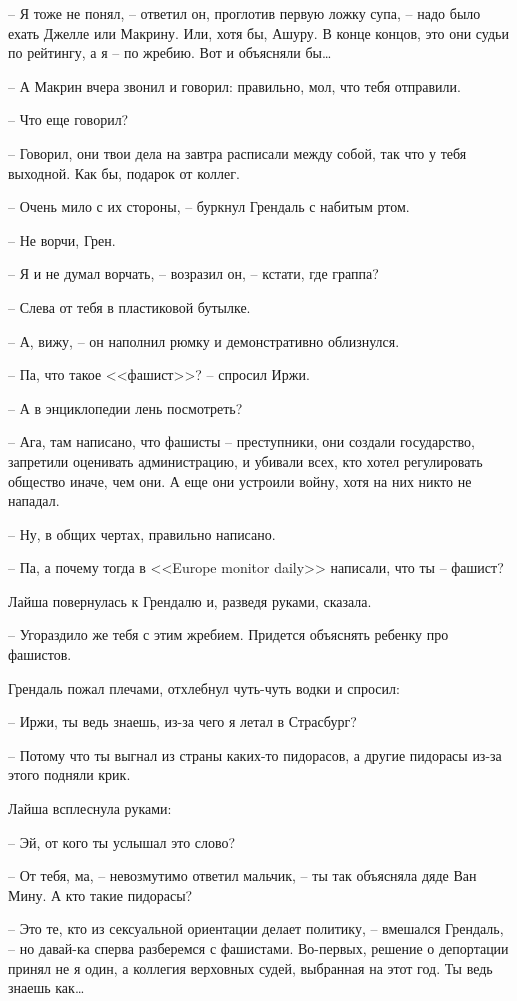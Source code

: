-- Я тоже не понял, -- ответил он, проглотив первую ложку супа, -- надо было ехать Джелле или Макрину. Или, хотя бы, Ашуру. В конце концов, это они судьи по рейтингу, а я -- по жребию. Вот и объясняли бы\ldots{}

-- А Макрин вчера звонил и говорил: правильно, мол, что тебя отправили.

-- Что еще говорил?

-- Говорил, они твои дела на завтра расписали между собой, так что у тебя выходной. Как бы, подарок от коллег.

-- Очень мило с их стороны, -- буркнул Грендаль с набитым ртом.

-- Не ворчи, Грен.

-- Я и не думал ворчать, -- возразил он, -- кстати, где граппа?

-- Слева от тебя в пластиковой бутылке.

-- А, вижу, -- он наполнил рюмку и демонстративно облизнулся.

-- Па, что такое <<фашист>>? -- спросил Иржи.

-- А в энциклопедии лень посмотреть?

-- Ага, там написано, что фашисты -- преступники, они создали государство, запретили оценивать администрацию, и убивали всех, кто хотел регулировать общество иначе, чем они. А еще они устроили войну, хотя на них никто не нападал.

-- Ну, в общих чертах, правильно написано.

-- Па, а почему тогда в <<Europe monitor daily>> написали, что ты -- фашист?

Лайша повернулась к Грендалю и, разведя руками, сказала.

-- Угораздило же тебя с этим жребием. Придется объяснять ребенку про фашистов.

Грендаль пожал плечами, отхлебнул чуть-чуть водки и спросил:

-- Иржи, ты ведь знаешь, из-за чего я летал в Страсбург?

-- Потому что ты выгнал из страны каких-то пидорасов, а другие пидорасы из-за этого подняли крик.

Лайша всплеснула руками:

-- Эй, от кого ты услышал это слово?

-- От тебя, ма, -- невозмутимо ответил мальчик, -- ты так объясняла дяде Ван Мину. А кто такие пидорасы?

-- Это те, кто из сексуальной ориентации делает политику, -- вмешался Грендаль, -- но давай-ка сперва разберемся с фашистами. Во-первых, решение о депортации принял не я один, а коллегия верховных судей, выбранная на этот год. Ты ведь знаешь как\ldots{}

